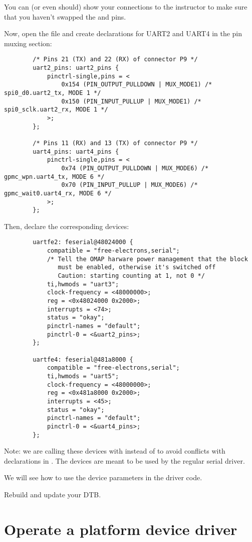 You can (or even should) show your connections to the instructor
to make sure that you haven't swapped the  and  pins. 

Now, open the 
file and create declarations for UART2 and UART4 in the pin muxing
section:

\begin{verbatim}
		/* Pins 21 (TX) and 22 (RX) of connector P9 */
		uart2_pins: uart2_pins {
			pinctrl-single,pins = <
				0x154 (PIN_OUTPUT_PULLDOWN | MUX_MODE1) /* spi0_d0.uart2_tx, MODE 1 */
				0x150 (PIN_INPUT_PULLUP | MUX_MODE1) /* spi0_sclk.uart2_rx, MODE 1 */
			>;
		};

		/* Pins 11 (RX) and 13 (TX) of connector P9 */
		uart4_pins: uart4_pins {
			pinctrl-single,pins = <
				0x74 (PIN_OUTPUT_PULLDOWN | MUX_MODE6) /* gpmc_wpn.uart4_tx, MODE 6 */
				0x70 (PIN_INPUT_PULLUP | MUX_MODE6) /* gpmc_wait0.uart4_rx, MODE 6 */
			>;
		};
\end{verbatim}

Then, declare the corresponding devices:

\begin{verbatim}
		uartfe2: feserial@48024000 {
			compatible = "free-electrons,serial";
			/* Tell the OMAP harware power management that the block
			   must be enabled, otherwise it's switched off
			   Caution: starting counting at 1, not 0 */
			ti,hwmods = "uart3";
			clock-frequency = <48000000>;
			reg = <0x48024000 0x2000>;
			interrupts = <74>;
			status = "okay";
			pinctrl-names = "default";
			pinctrl-0 = <&uart2_pins>;
		};

		uartfe4: feserial@481a8000 {
			compatible = "free-electrons,serial";
			ti,hwmods = "uart5";
			clock-frequency = <48000000>;
			reg = <0x481a8000 0x2000>;
			interrupts = <45>;
			status = "okay";
			pinctrl-names = "default";
			pinctrl-0 = <&uart4_pins>;
		};

\end{verbatim}

Note: we are calling these devices with  instead of
 to avoid conflicts with declarations in
. The  devices are 
meant to be used by the regular serial driver.

We will see how to use the device parameters in the driver code.

Rebuild and update your DTB.

\section{Operate a platform device driver}

